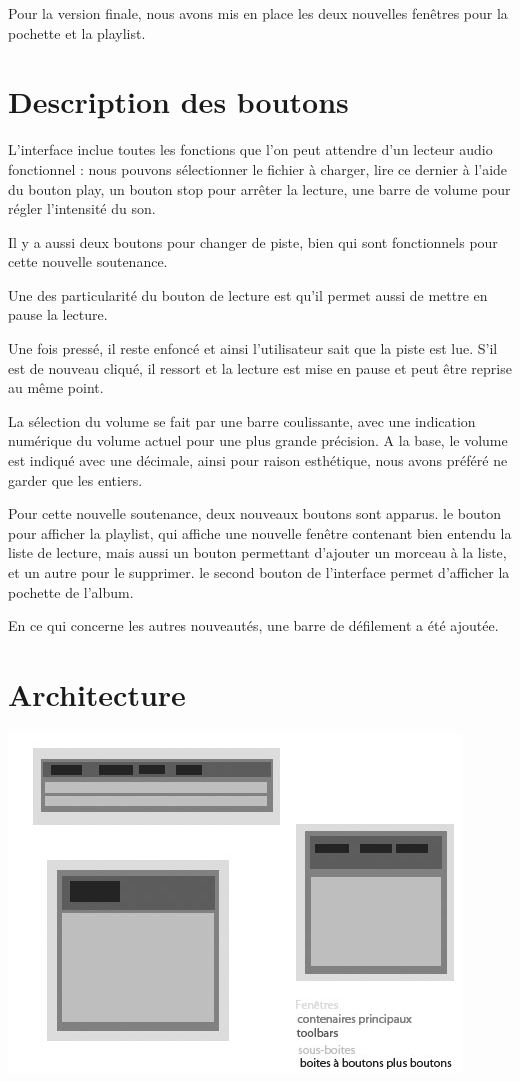 \documentclass[12pt,a4paper]{report}
\begin{document}
Pour la version finale, nous avons mis en place les deux nouvelles fenêtres pour la pochette et la playlist.

\section{Description des boutons}

L'interface inclue toutes les fonctions que l'on peut attendre d'un lecteur
audio fonctionnel : nous pouvons sélectionner le fichier à charger, lire ce dernier à l'aide du bouton play, un bouton stop pour arrêter la lecture, une barre de volume pour régler l'intensité du son.

Il y a aussi deux boutons pour changer de piste, bien qui sont fonctionnels pour cette nouvelle soutenance.

Une des particularité du bouton de lecture est qu'il permet aussi de mettre
en pause la lecture.

Une fois pressé, il reste enfoncé et ainsi l'utilisateur sait que la piste est lue. S'il est de nouveau cliqué, il ressort et la lecture est mise en pause et peut être reprise au même point.

La sélection du volume se fait par une barre coulissante, avec une indication
numérique du volume actuel pour une plus grande précision. A la base,
le volume est indiqué avec une décimale, ainsi pour raison esthétique, nous
avons préféré ne garder que les entiers.

Pour cette nouvelle soutenance, deux nouveaux boutons sont apparus.  le bouton pour afficher la playlist, qui affiche une nouvelle fenêtre contenant bien entendu la liste de lecture, mais aussi un bouton permettant d'ajouter un morceau à la liste, et un autre pour le supprimer.
le second bouton de l'interface permet d'afficher la pochette de l'album.

En ce qui concerne les autres nouveautés, une barre de défilement a été ajoutée.

\section{Architecture}



\begin{center}
\includegraphics[scale =0.8]{archi.jpg}
\end{center}
\end{document}
